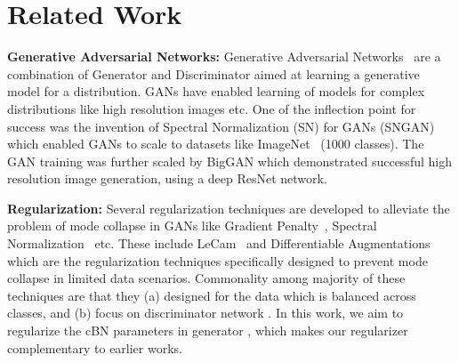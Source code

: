 \documentclass[runningheads,table]{llncs}
\begin{document}
\section{Related Work}
\noindent\textbf{Generative Adversarial Networks:} 
Generative Adversarial Networks~\cite{goodfellow2014generative} are a combination of Generator  and Discriminator  aimed at learning a generative model for a distribution. GANs have enabled learning of models for complex distributions like high resolution images etc. One of the inflection point for success was the invention of Spectral Normalization (SN) for GANs (SNGAN) which enabled GANs to scale to datasets like ImageNet~\cite{deng2009imagenet} (1000 classes). The GAN training was further scaled by BigGAN \cite{brock2018large} which demonstrated successful high resolution image generation, using a deep ResNet network. 

\noindent \textbf{Regularization:} Several regularization techniques \cite{zhang2019consistency, zhao2021improved, mao2019mode, kavalerov2019cgans, liu2019spectral, zhou2021omni} are developed to alleviate the problem of mode collapse in GANs like Gradient Penalty~\cite{gulrajani2017improved}, Spectral Normalization~\cite{miyato2018spectral} etc. These include LeCam~\cite{tseng2021regularizing} and Differentiable Augmentations~\cite{zhao2020differentiable, Karras2020ada} which are the regularization techniques specifically designed to prevent mode collapse in limited data scenarios. Commonality among majority of these techniques are that they (a) designed for the data which is balanced across classes, and (b) focus on discriminator network . In this work, we aim to regularize the cBN parameters in generator , which makes our regularizer complementary to earlier works.
\end{document}
